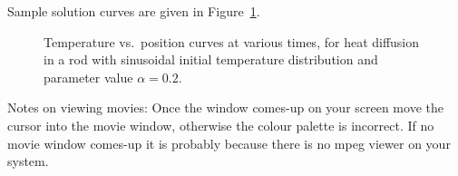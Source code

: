 \begin{example}
\begin{latexonly}
    Sample solution curves are given in Figure~\ref{lab1:fig:diffusion-1d}.
    \begin{figure}[htbp]
      \begin{center}
        \leavevmode
        \caption{Temperature vs.\ position curves at various times, for
          heat diffusion in a rod with sinusoidal initial
          temperature distribution and parameter value $\alpha=0.2$.} 
        \label{lab1:fig:diffusion-1d}
      \end{center}
    \end{figure}
\end{latexonly}

%
%

Notes on viewing movies:  Once the window comes-up on your screen
move the cursor into the movie window, otherwise the colour palette
is incorrect.  If no movie window comes-up it is probably because
there is no mpeg viewer on your system.


%
\begin{latexonly}
\end{latexonly}
\end{example}

